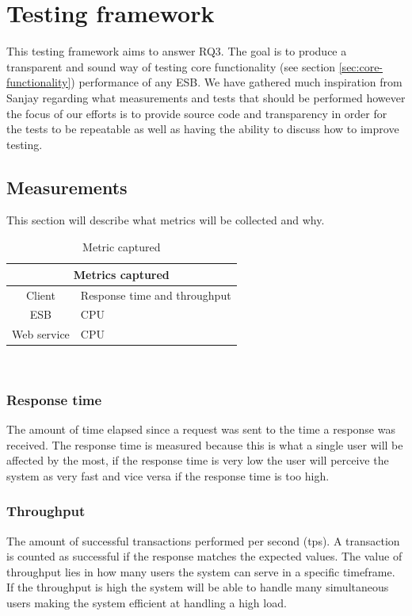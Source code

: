 \section{Testing framework}
This testing framework aims to answer RQ3. The goal is to produce a transparent and sound way of testing core functionality (see section \ref{sec:core-functionality}) performance of any ESB. 
We have gathered much inspiration from Sanjay \cite{Sanjay2011} regarding what measurements and tests that should be performed however the focus of our efforts is to provide source code and transparency in order for the tests to be repeatable as well as having the ability to discuss how to improve testing.

\subsection{Measurements}
This section will describe what metrics will be collected and why.\\

\begin{table}[H]
	\caption{Metric captured}
	\begin{tabular}{c l}
		\multicolumn{2}{c}{Metrics captured} \\
		\hline
		Client & Response time and throughput \\
		ESB & CPU \\ 
		Web service &  CPU \\
		\hline
	\end{tabular} \\
\end{table}

\subsubsection{Response time}
The amount of time elapsed since a request was sent to the time a response was received. 
The response time is measured because this is what a single user will be affected by the most, if the response time is very low the user will perceive the system as very fast and vice versa if the response time is too high.
\subsubsection{Throughput}
The amount of successful transactions performed per second (tps). A transaction is counted as successful if the response matches the expected values.
The value of throughput lies in how many users the system can serve in a specific timeframe. If the throughput is high the system will be able to handle many simultaneous users making the system efficient at handling a high load.



